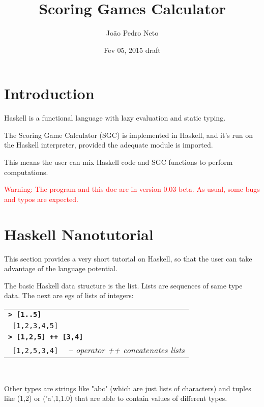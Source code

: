 \documentclass[a4paper,12pt]{article}
\newcommand{\bash}[1]{\small\textbf{\lstinline§> #1§}\\}
\newcommand{\out}[1]{\small\lstinline§ #1§}
\newcommand{\hsklcmt}[1]{~~-- \footnotesize\textit{#1}}
\newcommand{\haskellCode}{\fontfamily{pcr}\selectfont}
\newenvironment{sgcode}
	{ \haskellCode
	  \begin{tabular}{|p{0.9\textwidth}|}
      \hline	
	}
	{ \\\hline  
      \end{tabular} \\
	  \par 
	}
\begin{document}
\title{Scoring Games Calculator}
\author{Jo\~{a}o Pedro Neto}
\date{Fev 05, 2015 draft}
\maketitle

\newpage

\tableofcontents

\newpage \section*{Introduction}

Haskell is a functional language with lazy evaluation and static typing.

The Scoring Game Calculator (SGC) is implemented in Haskell, and it's run on 
the Haskell interpreter, provided the adequate module is imported. 

This means the user can mix Haskell code and SGC functions to perform computations.

\textcolor{red}{Warning: The program and this doc are in version 0.03 beta. As usual, some bugs and typos are expected.}

\section{Haskell Nanotutorial}

This section provides a very short tutorial on Haskell, so that the user can
take advantage of the language potential.

The basic Haskell data structure is the list. Lists are sequences of
same type data. The next are egs of lists of integers:

\begin{sgcode}
\bash{[1..5]}
\out{[1,2,3,4,5]} \\
\bash{[1,2,5] ++ [3,4]} 
\out{[1,2,5,3,4]} \hsklcmt{operator ++ concatenates lists}
\end{sgcode}

Other types are strings like "abc" (which are just lists of characters) 
and tuples like (1,2) or ('a',1,1.0) that are able to contain values of different types.
\end{document}
